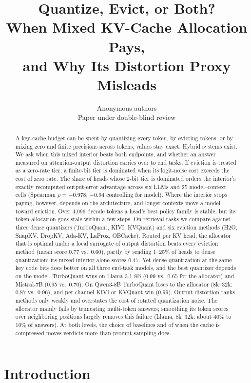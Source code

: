 \documentclass{article}
\title{Quantize, Evict, or Both?\\
When Mixed KV-Cache Allocation Pays,\\
and Why Its Distortion Proxy Misleads}
\author{Anonymous authors \\ Paper under double-blind review}
\theoremstyle{definition}
\begin{document}
\maketitle

\begin{abstract}
A key-cache budget can be spent by quantizing every token, by evicting tokens, or by mixing zero and finite precisions across tokens; values stay exact.  Hybrid systems exist.  We ask when this mixed interior beats both endpoints, and whether an answer measured on attention-output distortion carries over to end tasks.  If eviction is treated as a zero-rate tier, a finite-bit tier is dominated when its logit-noise cost exceeds the cost of zero rate.  The share of heads whose 2-bit tier is dominated orders the interior's exactly recomputed output-error advantage across six LLMs and 25 model--context cells (Spearman $\rho=-0.978$; $-0.94$ controlling for model).  Where the interior stops paying, however, depends on the architecture, and longer contexts move a model toward eviction.  Over 4,096 decode tokens a head's best policy family is stable, but its token allocation goes stale within a few steps.  On retrieval tasks we compare against three dense quantizers (TurboQuant, KIVI, KVQuant) and six eviction methods (H2O, SnapKV, DropKV, Ada-KV, LaProx, OBCache).  Routed per KV head, the allocator that is optimal under a local surrogate of output distortion beats every eviction method (mean score 0.77 vs.\ 0.60), partly by sending 1--25\% of heads to dense quantization; its mixed interior alone scores 0.47.
Yet dense quantization at the same key code bits does better on all three end-task models, and the best quantizer depends on the model.  TurboQuant wins on Llama-3.1-8B (0.99 vs.\ 0.65 for the allocator) and Mistral-7B (0.95 vs.\ 0.70).  On Qwen3-8B TurboQuant loses to the allocator (8k--32k: 0.87 vs.\ 0.96), and per-channel KIVI or KVQuant win (0.99).  Output distortion ranks methods only weakly and overstates the cost of rotated quantization noise.  The allocator mainly fails by truncating multi-token answers; smoothing its token scores over neighboring positions largely removes this failure (Llama, 8k--32k: about 40\% to 10\% of answers).  At both levels, the choice of baselines and of when the cache is compressed moves verdicts more than prompt sampling does.
\end{abstract}

\section{Introduction}
\label{sec:intro}
\end{document}
